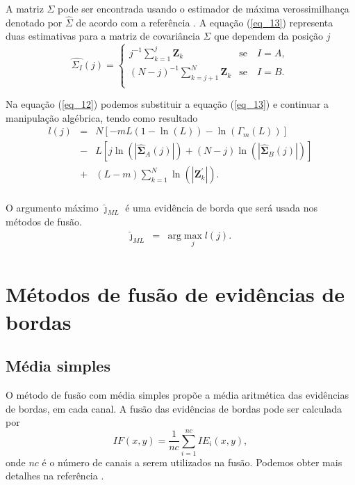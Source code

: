 \documentclass[conference]{IEEEtran}
\begin{document}
A matriz $\Sigma$ pode ser encontrada usando o estimador de máxima verossimilhança denotado por $\widehat{\Sigma}$ de acordo com a referência \cite{good}. A equação (\ref{eq_13}) representa duas estimativas para a matriz de covariância $\Sigma$ que dependem da posição $j$
\begin{equation}\label{eq_13}
\widehat{\Sigma_{I}}(j) = \left\{
\begin{array}{lc}
	j^{-1}\sum_{k=1}^{j}\mathbf{Z}_{k}  & \mbox{se}\quad I=A,  \\
        (N-j)^{-1}\sum_{k=j+1}^{N}\mathbf{Z}_{k} & \mbox{se}\quad I=B. \\
\end{array}
\right.
\end{equation}

Na equação (\ref{eq_12}) podemos substituir a equação (\ref{eq_13}) e continuar a manipulação algébrica, tendo como resultado 
\begin{equation}\label{eq_14}
\begin{array}{rcl}
	l(j)&=&N\left[-mL(1-\ln{\left(L\right)})-\ln{\left(\Gamma_m(L)\right)}\right]\\
	&-&L\left[j\ln{\left(|\mathbf{\widehat{\Sigma}}_{A}(j)|\right)} +(N-j)\ln{\left(|\mathbf{\widehat{\Sigma}}_{B}(j)|\right)}\right]\\
	&+&(L-m)\sum_{k=1}^{N}\ln{\left(|\mathbf{Z}_{k}^{'}|\right)}. \\
\end{array}
\end{equation}

O argumento máximo  $\widehat{\jmath}_{ML}$ é uma evidência de borda que será usada nos métodos de fusão.
\begin{equation*}
\begin{array}{rcl}
	\widehat{\jmath}_{ML}&=&\text{arg}\max\limits_{j}l(j).  \\
\end{array}
\end{equation*}
\section{Métodos de fusão de evidências de bordas}\label{sec_06}
\subsection{Média simples}
O método de fusão com média simples propõe a média aritmética das evidências de bordas, em cada canal. A fusão das evidências de bordas pode ser calculada por
\begin{equation}
	IF(x,y)=\frac{1}{nc}\sum_{i=1}^{nc}IE_i(x,y),
\end{equation}
onde $nc$ é o número de canais a serem utilizados na fusão. Podemos obter mais detalhes na referência \cite{mit}.
\end{document}
